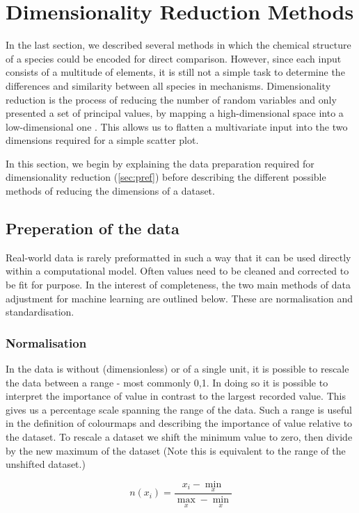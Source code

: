 \section{ Dimensionality Reduction Methods}
In the last section, we described several methods in which the chemical structure of a species could be encoded for direct comparison. However, since each input consists of a multitude of elements, it is still not a simple task to determine the differences and similarity between all species in mechanisms. Dimensionality reduction is the process of reducing the number of random variables and only presented a set of principal values, by mapping a high-dimensional space into a low-dimensional one \citep{drrandom}. This allows us to flatten a multivariate input into the two dimensions required for a simple scatter plot.

In this section, we begin by explaining the data preparation required for dimensionality reduction (\autoref{sec:pref}) before describing the different possible methods of reducing the dimensions of a dataset. 

\subsection{Preperation of the data}\label{sec:prep}
Real-world data is rarely preformatted in such a way that it can be used directly within a computational model. Often values need to be cleaned and corrected to be fit for purpose. In the interest of completeness, the two main methods of data adjustment for machine learning are outlined below. These are normalisation and standardisation. 


\subsubsection*{Normalisation}
In the data is without (dimensionless) or of a single unit, it is possible to rescale the data between a range - most commonly {0,1}. In doing so it is possible to interpret the importance of value in contrast to the largest recorded value. This gives us a percentage scale spanning the range of the data. Such a range is useful in the definition of colourmaps and describing the importance of value relative to the dataset. 
To rescale a dataset we shift the minimum value to zero, then divide by the new maximum of the dataset (Note this is equivalent to the range of the unshifted dataset.)

\begin{equation}
    n(x_i) = \frac{x_i - \min_x }{\max_x - \min_x}
    \label{eqn:n}
\end{equation}



